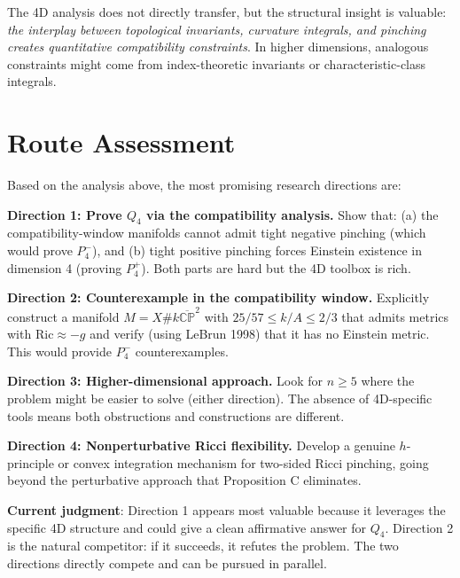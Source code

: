The 4D analysis does not directly transfer, but the structural insight is valuable:
\textit{the interplay between topological invariants, curvature integrals, and pinching
creates quantitative compatibility constraints}. In higher dimensions, analogous constraints
might come from index-theoretic invariants or characteristic-class integrals.


\section{Route Assessment}

Based on the analysis above, the most promising research directions are:

\textbf{Direction 1: Prove $Q_4$ via the compatibility analysis.}
Show that: (a) the compatibility-window manifolds cannot admit tight negative pinching
(which would prove $P_4^-$), and (b) tight positive pinching forces Einstein existence
in dimension 4 (proving $P_4^+$). Both parts are hard but the 4D toolbox is rich.

\textbf{Direction 2: Counterexample in the compatibility window.}
Explicitly construct a manifold $M = X \# k\overline{\mathbb{CP}}^2$ with $25/57 \leq k/A \leq 2/3$
that admits metrics with $\mathrm{Ric} \approx -g$ and verify (using LeBrun 1998) that it has 
no Einstein metric. This would provide $P_4^-$ counterexamples.

\textbf{Direction 3: Higher-dimensional approach.}
Look for $n \geq 5$ where the problem might be easier to solve (either direction).
The absence of 4D-specific tools means both obstructions and constructions are different.

\textbf{Direction 4: Nonperturbative Ricci flexibility.}
Develop a genuine $h$-principle or convex integration mechanism for two-sided Ricci pinching,
going beyond the perturbative approach that Proposition C eliminates.

\textbf{Current judgment}: Direction 1 appears most valuable because it leverages the
specific 4D structure and could give a clean affirmative answer for $Q_4$.
Direction 2 is the natural competitor: if it succeeds, it refutes the problem.
The two directions directly compete and can be pursued in parallel.
